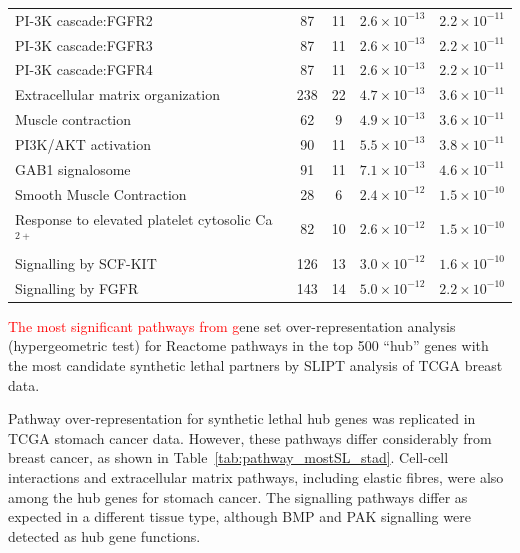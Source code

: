 \begin{table}[!ht]
{\begin{threeparttable}
\begin{tabular}{lcccc}
  \rowcolor{black!5}
  PI-3K cascade:FGFR2 &  87 &  11 & $2.6 \times 10^{-13}$ & $2.2 \times 10^{-11}$ \\ 
  \rowcolor{black!10}
  PI-3K cascade:FGFR3 &  87 &  11 & $2.6 \times 10^{-13}$ & $2.2 \times 10^{-11}$ \\ 
  \rowcolor{black!5}
  PI-3K cascade:FGFR4 &  87 &  11 & $2.6 \times 10^{-13}$ & $2.2 \times 10^{-11}$ \\ 
  \rowcolor{black!10}
  Extracellular matrix organization & 238 &  22 & $4.7 \times 10^{-13}$ & $3.6 \times 10^{-11}$ \\ 
  \rowcolor{black!5}
  Muscle contraction &  62 &   9 & $4.9 \times 10^{-13}$ & $3.6 \times 10^{-11}$ \\ 
  \rowcolor{black!10}
  PI3K/AKT activation &  90 &  11 & $5.5 \times 10^{-13}$ & $3.8 \times 10^{-11}$ \\ 
  \rowcolor{black!5}
  GAB1 signalosome &  91 &  11 & $7.1 \times 10^{-13}$ & $4.6 \times 10^{-11}$ \\ 
  \rowcolor{black!10}
  Smooth Muscle Contraction &  28 &   6 & $2.4 \times 10^{-12}$ & $1.5 \times 10^{-10}$ \\ 
  \rowcolor{black!5}
  Response to elevated platelet cytosolic Ca$^{2+}$ &  82 &  10 & $2.6 \times 10^{-12}$ & $1.5 \times 10^{-10}$ \\ 
  \rowcolor{black!10}
  Signalling by SCF-KIT & 126 &  13 & $3.0 \times 10^{-12}$ & $1.6 \times 10^{-10}$ \\ 
  \rowcolor{black!5}
  Signalling by FGFR & 143 &  14 & $5.0 \times 10^{-12}$ & $2.2 \times 10^{-10}$ \\ 
   \hline
\end{tabular}
\begin{tablenotes}
\raggedright %
\textcolor{red}{The most significant pathways from g}ene set over-representation analysis (hypergeometric test) for Reactome \glspl{pathway} in the top 500 ``hub'' genes with the most candidate \gls{synthetic lethal} partners by \gls{SLIPT} analysis of \gls{TCGA} breast  data.
\end{tablenotes}
\end{threeparttable}
}
\end{table}

Pathway over-representation for \gls{synthetic lethal} hub genes was replicated in \gls{TCGA} stomach cancer  data. However, these \glspl{pathway} differ considerably from breast cancer, as shown in Table~\ref{tab:pathway_mostSL_stad}. Cell-cell interactions and extracellular matrix \glspl{pathway}, including elastic fibres, were also among the hub genes for stomach cancer. The signalling \glspl{pathway} differ as expected in a different tissue type, although BMP and PAK signalling were detected as hub gene functions.
\fi

